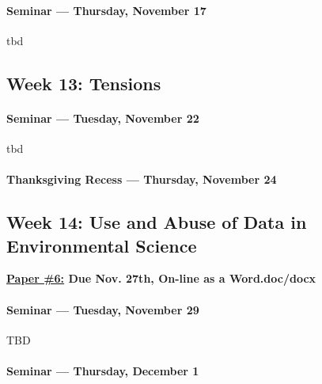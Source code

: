     
    \paragraph{Seminar --- Thursday, November 17}
    
    \begin{itemize*}
    \item tbd
    \end{itemize*}	
    
    \subsection{\textbf{Week 13}: Tensions}
    
    \paragraph{Seminar --- Tuesday, November 22}
    
    \begin{itemize*}
    \item tbd
    \end{itemize*}
    
    
    \paragraph{Thanksgiving Recess --- Thursday, November 24}
    
    \subsection{\textbf{Week 14}: Use and Abuse of Data in Environmental Science}

\textbf{\underline{Paper \#6:} Due Nov. 27th, On-line as a Word.doc/docx}

    \paragraph{Seminar --- Tuesday, November 29}
    
    \begin{itemize*}
    \item TBD
    \end{itemize*}	
    

    \paragraph{Seminar --- Thursday, December 1}
    
